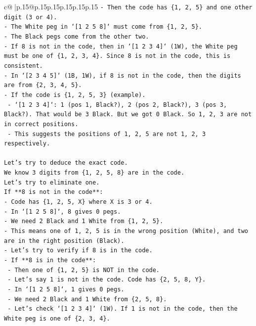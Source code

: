 \documentclass{article}
\begin{document}
{\begin{supertabular}{c@{$\;$}|p{.15\linewidth}@{}p{.15\linewidth}p{.15\linewidth}p{.15\linewidth}p{.15\linewidth}p{.15\linewidth}}
{{{\texttt{{-} Then the code has \{1, 2, 5\} and one other digit (3 or 4).} \\
\texttt{{-} The White peg in `{[}1 2 5 8{]}` must come from \{1, 2, 5\}.} \\
\texttt{{-} The Black pegs come from the other two.} \\
\texttt{{-} If 8 is not in the code, then in `{[}1 2 3 4{]}` (1W), the White peg must be one of \{1, 2, 3, 4\}. Since 8 is not in the code, this is consistent.} \\
\texttt{{-} In `{[}2 3 4 5{]}` (1B, 1W), if 8 is not in the code, then the digits are from \{2, 3, 4, 5\}.} \\
\texttt{{-} If the code is \{1, 2, 5, 3\} (example).} \\
\texttt{  {-} `{[}1 2 3 4{]}`: 1 (pos 1, Black?), 2 (pos 2, Black?), 3 (pos 3, Black?). That would be 3 Black. But we got 0 Black. So 1, 2, 3 are not in correct positions.} \\
\texttt{  {-} This suggests the positions of 1, 2, 5 are not 1, 2, 3 respectively.} \\
\\ 
\texttt{Let's try to deduce the exact code.} \\
\texttt{We know 3 digits from \{1, 2, 5, 8\} are in the code.} \\
\texttt{Let's try to eliminate one.} \\
\texttt{If **8 is not in the code**:} \\
\texttt{{-} Code has \{1, 2, 5, X\} where X is 3 or 4.} \\
\texttt{{-} In `{[}1 2 5 8{]}`, 8 gives 0 pegs.} \\
\texttt{{-} We need 2 Black and 1 White from \{1, 2, 5\}.} \\
\texttt{{-} This means one of 1, 2, 5 is in the wrong position (White), and two are in the right position (Black).} \\
\texttt{{-} Let's try to verify if 8 is in the code.} \\
\texttt{{-} If **8 is in the code**:} \\
\texttt{  {-} Then one of \{1, 2, 5\} is NOT in the code.} \\
\texttt{  {-} Let's say 1 is not in the code. Code has \{2, 5, 8, Y\}.} \\
\texttt{  {-} In `{[}1 2 5 8{]}`, 1 gives 0 pegs.} \\
\texttt{  {-} We need 2 Black and 1 White from \{2, 5, 8\}.} \\
\texttt{  {-} Let's check `{[}1 2 3 4{]}` (1W). If 1 is not in the code, then the White peg is one of \{2, 3, 4\}.} \\
}}}
\end{supertabular}}
\end{document}
